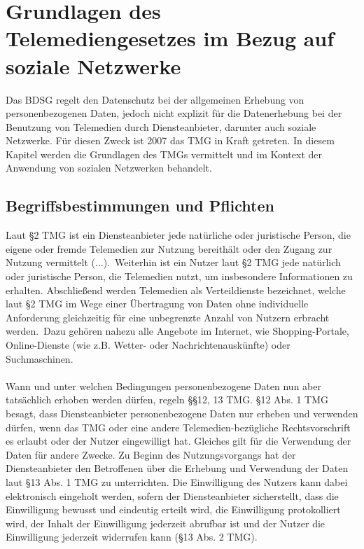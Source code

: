 \chapter{Grundlagen des Telemediengesetzes im Bezug auf soziale Netzwerke}
Das BDSG regelt den Datenschutz bei der allgemeinen Erhebung von personenbezogenen Daten, jedoch nicht explizit für die Datenerhebung bei der Benutzung von Telemedien durch Diensteanbieter, darunter auch soziale Netzwerke. Für diesen Zweck ist 2007 das \ac{TMG} in Kraft getreten.\autocite[vgl.][]{klicksafe.de} \autocite[vgl.][]{shr.de} In diesem Kapitel werden die Grundlagen des TMGs vermittelt und im Kontext der Anwendung von sozialen Netzwerken behandelt.
\section{Begriffsbestimmungen und Pflichten}
Laut \S 2 TMG ist ein Diensteanbieter \glqq jede natürliche oder juristische Person, die eigene oder fremde Telemedien zur Nutzung bereithält oder den Zugang zur Nutzung vermittelt (...).\grqq \ Weiterhin ist ein Nutzer laut \S 2 TMG jede natürlich oder juristische Person, die Telemedien nutzt, um insbesondere Informationen zu erhalten. Abschließend werden Telemedien als Verteildienste bezeichnet, welche laut \S 2 TMG \glqq im Wege einer Übertragung von Daten ohne individuelle Anforderung gleichzeitig für eine unbegrenzte Anzahl von Nutzern erbracht werden.\grqq \ Dazu gehören nahezu alle Angebote im Internet, wie Shopping-Portale, Online-Dienste (wie z.B. Wetter- oder Nachrichtenauskünfte) oder Suchmaschinen.\autocite[vgl.][]{shr.de}\\
\\Wann und unter welchen Bedingungen personenbezogene Daten nun aber tatsächlich erhoben werden dürfen, regeln \S\S 12, 13 TMG.  \S 12 Abs. 1 TMG besagt, dass Diensteanbieter personenbezogene Daten nur erheben und verwenden dürfen, wenn das TMG oder eine andere Telemedien-bezügliche Rechtsvorschrift es erlaubt oder der Nutzer eingewilligt hat. Gleiches gilt für die Verwendung der Daten für andere Zwecke. Zu Beginn des Nutzungsvorgangs hat der Diensteanbieter den Betroffenen über die Erhebung und Verwendung der Daten laut \S 13 Abs. 1 TMG zu unterrichten. Die Einwilligung des Nutzers kann dabei elektronisch eingeholt werden, sofern der Diensteanbieter sicherstellt, dass die Einwilligung bewusst und eindeutig erteilt wird, die Einwilligung protokolliert wird, der Inhalt der Einwilligung jederzeit abrufbar ist und der Nutzer die Einwilligung jederzeit widerrufen kann (\S 13 Abs. 2 TMG).
